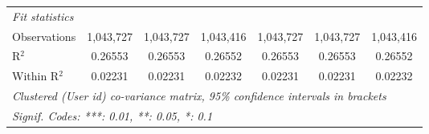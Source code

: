 \begin{table}[htbp]
\begin{threeparttable}[b]
\begin{tabular}{lcccccc}
         \midrule
         \emph{Fit statistics}\\
         Observations               & 1,043,727            & 1,043,727            & 1,043,416            & 1,043,727            & 1,043,727            & 1,043,416\\  
         R$^2$                      & 0.26553              & 0.26553              & 0.26552              & 0.26553              & 0.26553              & 0.26552\\  
         Within R$^2$               & 0.02231              & 0.02231              & 0.02232              & 0.02231              & 0.02231              & 0.02232\\  
         \midrule \midrule
         \multicolumn{7}{l}{\emph{Clustered (User id) co-variance matrix, 95\% confidence intervals in brackets}}\\
         \multicolumn{7}{l}{\emph{Signif. Codes: ***: 0.01, **: 0.05, *: 0.1}}\\
      \end{tabular}
   \end{threeparttable}
\end{table}


